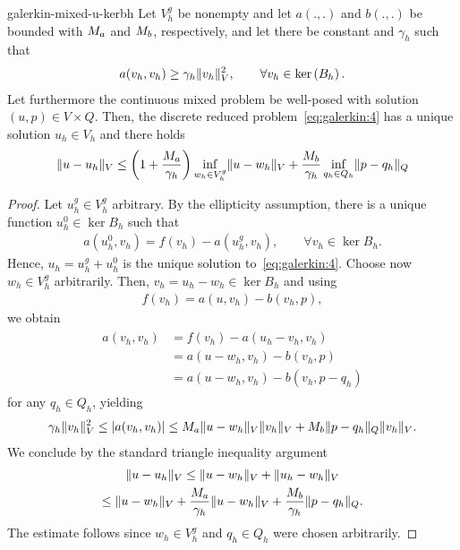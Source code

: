 \begin{Theorem}{galerkin-mixed-u-kerbh}
  Let $V_h^g$ be nonempty and let $a(.,.)$ and $b(.,.)$ be bounded
  with $M_a$ and $M_b$, respectively, and let there be constant and $\gamma_h$
  such that
  \begin{gather}
    \label{eq:galerkin:5}
    a(v_h, v_h) \ge \gamma_h \lVert v_h\rVert^2_V,
    \qquad\forall v_h\in \operatorname{ker}\left(B_h\right).
  \end{gather}
  Let furthermore the continuous mixed problem be well-posed with
  solution $(u,p)\in V\times Q$.
  Then, the discrete reduced problem~\eqref{eq:galerkin:4} has a
  unique solution $u_h\in V_h$ and there holds
  \begin{gather}
    \label{eq:galerkin:8}
    \lVert u-u_h\rVert_V \le \left(1+\frac{M_a}{\gamma_h}\right)
    \inf_{w_h\in V_h^g}\lVert u-w_h\rVert_V
    + \frac{M_b}{\gamma_h}
    \inf_{q_h\in Q_h}\lVert p-q_h\rVert_Q
  \end{gather}
\end{Theorem}

\begin{proof}
  Let $u_h^g \in V_h^g$ arbitrary. By the ellipticity assumption,
  there is a unique function $u_h^0\in \ker{B_h}$ such that
  \begin{gather}
    a(u_h^0,v_h) = f(v_h) - a(u_h^g,v_h),
    \qquad\forall v_h\in \ker{B_h}.
  \end{gather}
  Hence, $u_h = u_h^g + u_h^0$ is the unique solution
  to~\eqref{eq:galerkin:4}. Choose now $w_h\in V_h^g$
  arbitrarily. Then, $v_h = u_h-w_h\in \ker{B_h}$ and using
  \begin{gather}
    f(v_h) = a(u, v_h) - b(v_h, p),
  \end{gather}
  we obtain
  \begin{gather}
    \begin{split}
      \label{eq:galerkin:9}
      a(v_h, v_h)
      &= f(v_h) - a(u_h-v_h, v_h) \\
      &= a(u-w_h, v_h) - b(v_h, p) \\
      &= a(u-w_h, v_h) - b(v_h, p-q_h)
    \end{split}
  \end{gather}
  for any $q_h\in Q_h$, yielding
  \begin{gather}
    \gamma_h\lVert v_h\rVert^2_V
    \le \lvert a(v_h, v_h)\rvert
    \le M_a \lVert u-w_h\rVert_V \lVert v_h\rVert_V
      + M_b \lVert p-q_h\rVert_Q \lVert v_h\rVert_V.
  \end{gather}
  We conclude by the standard triangle inequality argument
  \begin{multline}
    \lVert u-u_h\rVert_V \le \lVert u-w_h\rVert_V + \lVert u_h-w_h\rVert_V
    \\
    \le \lVert u-w_h\rVert_V + \frac{M_a}{\gamma_h} \lVert u-w_h\rVert_V
    + \frac{M_b}{\gamma_h} \lVert p-q_h\rVert_Q.
  \end{multline}
  The estimate follows since $w_h\in V_h^g$ and $q_h\in Q_h$ were
  chosen arbitrarily.
\end{proof}

